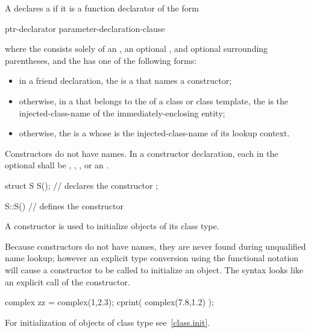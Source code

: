 \pnum
A  declares a  if it is a
function declarator of the form
\begin{ncbnf}
ptr-declarator \terminal{(} parameter-declaration-clause \terminal{)}  
\end{ncbnf}
where the  consists solely of an
, an optional ,
and optional surrounding parentheses, and the  has
one of the following forms:
\begin{itemize}
\item
in a friend declaration,
the  is a 
that names a constructor;
\item
otherwise, in a  that belongs to the
 of a class or class template,
the  is the
injected-class-name of the immediately-enclosing entity;

\item
otherwise, the
 is a 
whose  is
the injected-class-name of its lookup context.
\end{itemize}
Constructors do not have names.
In a constructor declaration, each  in the optional
 shall be , ,
, or an .
\begin{example}
\begin{codeblock}
struct S {
  S();              // declares the constructor
};

S::S() { }          // defines the constructor
\end{codeblock}
\end{example}

\pnum
{}%
A constructor is used to initialize objects of its class type.
\begin{note}
Because constructors do not have names, they are never found during
unqualified name lookup; however an explicit type conversion using the functional
notation will cause a constructor to be called to
initialize an object.
The syntax looks like an explicit call of the constructor.
\end{note}
\begin{example}
\begin{codeblock}
complex zz = complex(1,2.3);
cprint( complex(7.8,1.2) );
\end{codeblock}
\end{example}
\begin{note}
For initialization of objects of class type see~\ref{class.init}.
\end{note}

